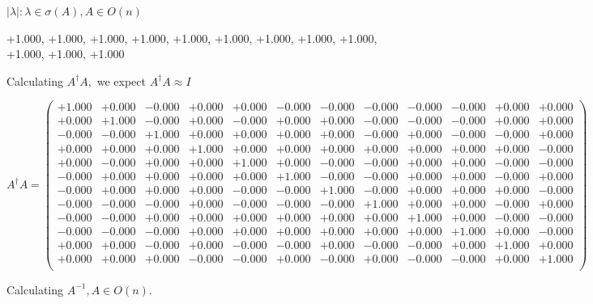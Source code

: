 \documentclass[9pt]{article}
\theoremstyle{plain}
\theoremstyle{definition}
\theoremstyle{remark}
\numberwithin{equation}{section}
\begin{document}
 $|\lambda | : \lambda \in \sigma(A) , A \in O(n)$

+1.000, +1.000, +1.000, +1.000, +1.000, +1.000, +1.000, +1.000, +1.000, +1.000, +1.000, +1.000


Calculating $A^{\dag} A,$  we expect $A^{\dag} A \approx I$

$A^{\dag} A = \left(
\begin{array}{
cccccccccccc}
+1.000 & +0.000 & -0.000 & +0.000 & +0.000 & -0.000 & -0.000 & -0.000 & -0.000 & -0.000 & +0.000 & +0.000 \\
+0.000 & +1.000 & -0.000 & +0.000 & -0.000 & +0.000 & +0.000 & -0.000 & -0.000 & -0.000 & +0.000 & +0.000 \\
-0.000 & -0.000 & +1.000 & +0.000 & +0.000 & +0.000 & +0.000 & -0.000 & +0.000 & -0.000 & -0.000 & +0.000 \\
+0.000 & +0.000 & +0.000 & +1.000 & +0.000 & +0.000 & +0.000 & +0.000 & +0.000 & +0.000 & +0.000 & -0.000 \\
+0.000 & -0.000 & +0.000 & +0.000 & +1.000 & +0.000 & -0.000 & -0.000 & +0.000 & +0.000 & -0.000 & -0.000 \\
-0.000 & +0.000 & +0.000 & +0.000 & +0.000 & +1.000 & -0.000 & -0.000 & +0.000 & +0.000 & -0.000 & +0.000 \\
-0.000 & +0.000 & +0.000 & +0.000 & -0.000 & -0.000 & +1.000 & -0.000 & +0.000 & +0.000 & +0.000 & -0.000 \\
-0.000 & -0.000 & -0.000 & +0.000 & -0.000 & -0.000 & -0.000 & +1.000 & +0.000 & +0.000 & -0.000 & +0.000 \\
-0.000 & -0.000 & +0.000 & +0.000 & +0.000 & +0.000 & +0.000 & +0.000 & +1.000 & +0.000 & -0.000 & -0.000 \\
-0.000 & -0.000 & -0.000 & +0.000 & +0.000 & +0.000 & +0.000 & +0.000 & +0.000 & +1.000 & +0.000 & -0.000 \\
+0.000 & +0.000 & -0.000 & +0.000 & -0.000 & -0.000 & +0.000 & -0.000 & -0.000 & +0.000 & +1.000 & +0.000 \\
+0.000 & +0.000 & +0.000 & -0.000 & -0.000 & +0.000 & -0.000 & +0.000 & -0.000 & -0.000 & +0.000 & +1.000 \\
\end{array}
\right)$ \newline 

Calculating $A^{-1} ,  A \in O(n)$.
\end{document}

